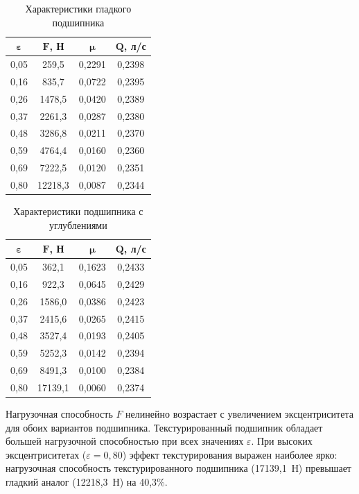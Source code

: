 \begin{table}[H]
\small
\centering
\caption{Характеристики гладкого подшипника}
\label{tab:smooth_results}
\begin{tabular}{|c|c|c|c|}
\hline
$\boldsymbol{\varepsilon}$ & $\boldsymbol{F}$\textbf{, Н} & $\boldsymbol{\mu}$ & $\boldsymbol{Q}$\textbf{, л/с} \\
\hline
0{,}05 & 259{,}5 & 0{,}2291 & 0{,}2398 \\
\hline
0{,}16 & 835{,}7 & 0{,}0722 & 0{,}2395 \\
\hline
0{,}26 & 1478{,}5 & 0{,}0420 & 0{,}2389 \\
\hline
0{,}37 & 2261{,}3 & 0{,}0287 & 0{,}2380 \\
\hline
0{,}48 & 3286{,}8 & 0{,}0211 & 0{,}2370 \\
\hline
0{,}59 & 4764{,}4 & 0{,}0160 & 0{,}2360 \\
\hline
0{,}69 & 7222{,}5 & 0{,}0120 & 0{,}2351 \\
\hline
0{,}80 & 12218{,}3 & 0{,}0087 & 0{,}2344 \\
\hline
\end{tabular}
\end{table}

\begin{table}[H]
\small
\centering
\caption{Характеристики подшипника с \varDimpleTypeGenitive{} углублениями}
\label{tab:textured_results}
\begin{tabular}{|c|c|c|c|}
\hline
$\boldsymbol{\varepsilon}$ & $\boldsymbol{F}$\textbf{, Н} & $\boldsymbol{\mu}$ & $\boldsymbol{Q}$\textbf{, л/с} \\
\hline
0{,}05 & 362{,}1 & 0{,}1623 & 0{,}2433 \\
\hline
0{,}16 & 922{,}3 & 0{,}0645 & 0{,}2429 \\
\hline
0{,}26 & 1586{,}0 & 0{,}0386 & 0{,}2423 \\
\hline
0{,}37 & 2415{,}6 & 0{,}0265 & 0{,}2415 \\
\hline
0{,}48 & 3527{,}4 & 0{,}0193 & 0{,}2405 \\
\hline
0{,}59 & 5252{,}3 & 0{,}0142 & 0{,}2394 \\
\hline
0{,}69 & 8491{,}3 & 0{,}0100 & 0{,}2384 \\
\hline
0{,}80 & 17139{,}1 & 0{,}0060 & 0{,}2374 \\
\hline
\end{tabular}
\end{table}

Нагрузочная способность $F$ нелинейно возрастает с увеличением эксцентриситета для обоих вариантов подшипника. Текстурированный подшипник обладает большей нагрузочной способностью при всех значениях $\varepsilon$. При высоких эксцентриситетах ($\varepsilon = 0{,}80$) эффект текстурирования выражен наиболее ярко: нагрузочная способность текстурированного подшипника (17139{,}1~Н) превышает гладкий аналог (12218{,}3~Н) на 40{,}3\%.

